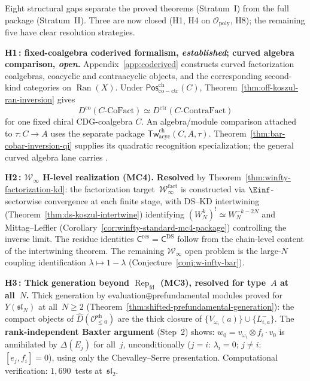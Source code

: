 \begin{remark}\label{rem:structural-gaps}
Eight structural gaps separate the proved theorems
(Stratum~I) from the full package (Stratum~II).
Three are now closed \textup{(}H1, H4 on
$\mathcal{O}_{\mathrm{poly}}$, H8\textup{)};
the remaining five have clear resolution strategies.

\smallskip\noindent
\textbf{H1\,: fixed-coalgebra coderived formalism,
\emph{established}; curved algebra comparison, \emph{open}.}
Appendix~\ref{app:coderived} constructs curved factorization
coalgebras, coacyclic and contraacyclic objects, and the corresponding
second-kind categories on \(\operatorname{Ran}(X)\).  Under
\(\mathsf{Pos}^{\mathrm{ch}}_{\mathrm{co-ctr}}(C)\),
Theorem~\ref{thm:off-koszul-ran-inversion} gives
\[
D^{\mathrm{co}}(C\text{-}\mathrm{CoFact})
\simeq
D^{\mathrm{ctr}}(C\text{-}\mathrm{ContraFact})
\]
for one fixed chiral CDG-coalgebra \(C\).  An algebra/module
comparison attached to \(\tau\colon C\to A\) uses the separate
package
\(\mathsf{Tw}^{\mathrm{ch}}_{\mathrm{acyc}}(C,A,\tau)\).
Theorem~\ref{thm:bar-cobar-inversion-qi} supplies its quadratic
recognition specialization; the general curved algebra lane carries
\ClaimStatusOpen.

\smallskip\noindent
\textbf{H2\,: $\mathcal{W}_\infty$ H-level realization (MC4).}
\textbf{Resolved} by Theorem~\ref{thm:winfty-factorization-kd}: the
factorization target~$\mathcal{W}_\infty^{\mathrm{fact}}$ is
constructed via $\Einf$-sectorwise convergence at each finite
stage, with DS--KD intertwining
(Theorem~\ref{thm:ds-koszul-intertwine}) identifying
$(W_N^k)^! \simeq W_N^{-k-2N}$ and
Mittag--Leffler
(Corollary~\ref{cor:winfty-standard-mc4-package}) controlling the
inverse limit. The residue identities
$\mathsf{C}^{\mathrm{res}} = \mathsf{C}^{\mathrm{DS}}$ follow
from the chain-level content of the intertwining theorem.
The remaining $\mathcal{W}_\infty$ open problem is the large-$N$
coupling identification $\lambda \mapsto 1 - \lambda$
(Conjecture~\ref{conj:w-infty-bar}).

\smallskip\noindent
\textbf{H3\,: Thick generation beyond $\operatorname{Rep}_{\mathrm{fd}}$ (MC3),
\textbf{resolved for type~$A$ at all~$N$}.}
Thick generation by evaluation$\oplus$prefundamental modules
proved for $Y(\mathfrak{sl}_N)$ at all~$N \geq 2$
(Theorem~\ref{thm:shifted-prefundamental-generation}):
the compact objects of
$\widehat{D}(\mathcal{O}^{\mathrm{sh}}_{\leq 0})$ are the
thick closure of $\{V_{\omega_i}(a)\} \cup \{L^-_{i,a}\}$.
The \textbf{rank-independent Baxter argument} (Step~2) shows:
$w_0 = v_{\omega_i} \otimes f_i \cdot v_0$ is annihilated by
$\Delta(E_j)$ for all~$j$, unconditionally ($j = i$: $\lambda_i = 0$;
$j \neq i$: $[e_j, f_i] = 0$), using only the Chevalley--Serre
presentation. Computational verification: $1{,}690$~tests
at~$\mathfrak{sl}_2$.


\end{remark}
